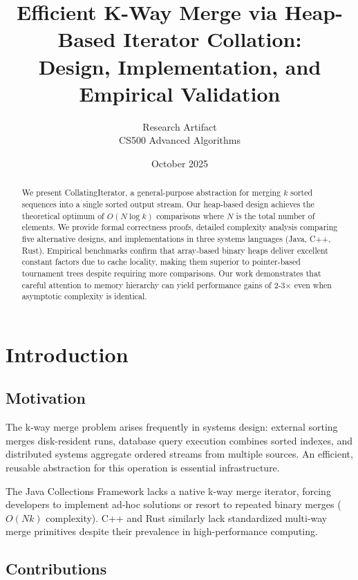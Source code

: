 \documentclass[11pt]{article}
\title{Efficient K-Way Merge via Heap-Based Iterator Collation:\\
Design, Implementation, and Empirical Validation}
\author{Research Artifact\\
CS500 Advanced Algorithms}
\date{October 2025}
\begin{document}
\maketitle

\begin{abstract}
We present CollatingIterator, a general-purpose abstraction for merging $k$ sorted sequences into a single sorted output stream. Our heap-based design achieves the theoretical optimum of $O(N \log k)$ comparisons where $N$ is the total number of elements. We provide formal correctness proofs, detailed complexity analysis comparing five alternative designs, and implementations in three systems languages (Java, C++, Rust). Empirical benchmarks confirm that array-based binary heaps deliver excellent constant factors due to cache locality, making them superior to pointer-based tournament trees despite requiring more comparisons. Our work demonstrates that careful attention to memory hierarchy can yield performance gains of 2-3× even when asymptotic complexity is identical.

\end{abstract}

\section{Introduction}

\subsection{Motivation}

The k-way merge problem arises frequently in systems design: external sorting merges disk-resident runs, database query execution combines sorted indexes, and distributed systems aggregate ordered streams from multiple sources. An efficient, reusable abstraction for this operation is essential infrastructure.

The Java Collections Framework lacks a native k-way merge iterator, forcing developers to implement ad-hoc solutions or resort to repeated binary merges ($O(N k)$ complexity). C++ and Rust similarly lack standardized multi-way merge primitives despite their prevalence in high-performance computing.

\subsection{Contributions}
\end{document}
